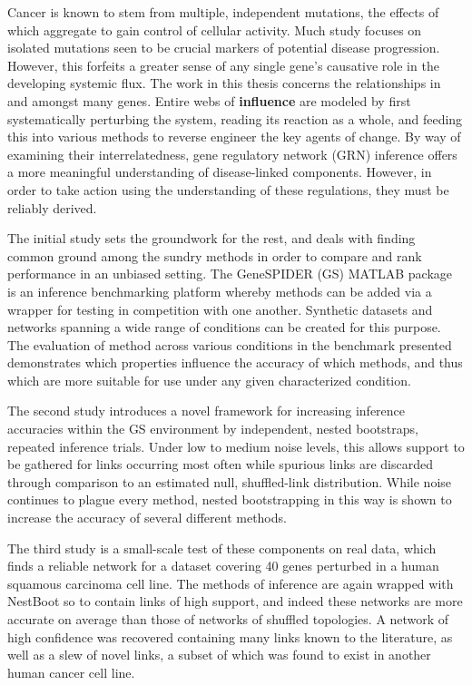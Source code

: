 
\begin{abstracts}

Cancer is known to stem from multiple, independent mutations, the effects of which aggregate to gain control of cellular activity. Much study focuses on isolated mutations seen to be crucial markers of potential disease progression. However, this forfeits a greater sense of any single gene's causative role in the developing systemic flux. The work in this thesis concerns the relationships in and amongst many genes. Entire webs of \textbf{influence} are modeled by first systematically perturbing the system, reading its reaction as a whole, and feeding this into various methods to reverse engineer the key agents of change. By way of examining their interrelatedness, gene regulatory network (GRN) inference offers a more meaningful understanding of disease-linked components. However, in order to take action using the understanding of these regulations, they must be reliably derived.

The initial study sets the groundwork for the rest, and deals with finding common ground among the sundry methods in order to compare and rank performance in an unbiased setting. The GeneSPIDER (GS) MATLAB package is an inference benchmarking platform whereby methods can be added via a wrapper for testing in competition with one another. Synthetic datasets and networks spanning a wide range of conditions can be created for this purpose. The evaluation of method across various conditions in the benchmark presented demonstrates which properties influence the accuracy of which methods, and thus which are more suitable for use under any given characterized condition.

The second study introduces a novel framework for increasing inference accuracies within the GS environment by independent, nested bootstraps, \ie repeated inference trials. Under low to medium noise levels, this allows support to be gathered for links occurring most often while spurious links are discarded through comparison to an estimated null, shuffled-link distribution. While noise continues to plague every method, nested bootstrapping in this way is shown to increase the accuracy of several different methods.

The third study is a small-scale test of these components on real data, which finds a reliable network for a dataset covering 40 genes perturbed in a human squamous carcinoma cell line. The methods of inference are again wrapped with NestBoot so to contain links of high support, and indeed these networks are more accurate on average than those of networks of shuffled topologies. A network of high confidence was recovered containing many links known to the literature, as well as a slew of novel links, a subset of which was found to exist in another human cancer cell line.


\end{abstracts}
